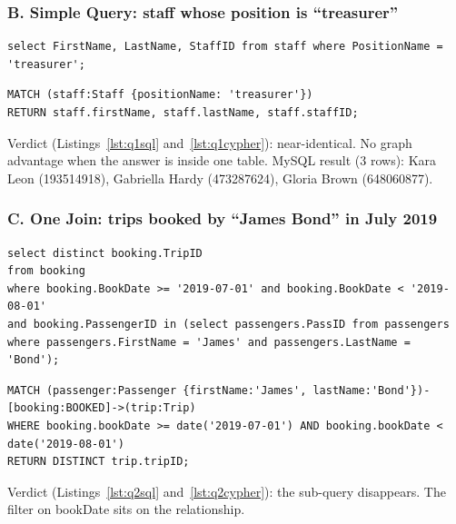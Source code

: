 \documentclass[10pt,a4paper,twocolumn]{article}
\begin{document}
\subsubsection*{B. Simple Query: staff whose position is ``treasurer''}

\begin{lstlisting}[style=sqlcode,caption={Selecting staff by position in SQL},label={lst:q1sql}]
select FirstName, LastName, StaffID from staff where PositionName = 'treasurer';
\end{lstlisting}

\begin{lstlisting}[style=cyphercode,caption={Selecting staff by position in Cypher},label={lst:q1cypher}]
MATCH (staff:Staff {positionName: 'treasurer'})
RETURN staff.firstName, staff.lastName, staff.staffID;
\end{lstlisting}

Verdict (Listings~\ref{lst:q1sql} and~\ref{lst:q1cypher}): near-identical. No graph advantage when the answer is inside one table. MySQL result (3 rows): Kara Leon (193514918), Gabriella Hardy (473287624), Gloria Brown (648060877).

\subsubsection*{C. One Join: trips booked by ``James Bond'' in July 2019}

\begin{lstlisting}[style=sqlcode,caption={Trips booked by one passenger in July 2019, in SQL},label={lst:q2sql}]
select distinct booking.TripID
from booking
where booking.BookDate >= '2019-07-01' and booking.BookDate < '2019-08-01'
and booking.PassengerID in (select passengers.PassID from passengers
where passengers.FirstName = 'James' and passengers.LastName = 'Bond');
\end{lstlisting}

\begin{lstlisting}[style=cyphercode,caption={The same query in Cypher, filtering in a separate WHERE clause},label={lst:q2cypher}]
MATCH (passenger:Passenger {firstName:'James', lastName:'Bond'})-[booking:BOOKED]->(trip:Trip)
WHERE booking.bookDate >= date('2019-07-01') AND booking.bookDate < date('2019-08-01')
RETURN DISTINCT trip.tripID;
\end{lstlisting}

Verdict (Listings~\ref{lst:q2sql} and~\ref{lst:q2cypher}): the sub-query disappears. The filter on bookDate sits on the relationship.
\end{document}
